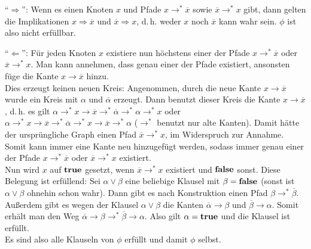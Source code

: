 \begin{Beweis}
    "`$\Rightarrow$"':
    Wenn es einen Knoten $x$ und
    Pfade $x \rightarrow^\ast \overline{x}$ sowie $\overline{x} \rightarrow^\ast x$ gibt,
    dann gelten die Implikationen $x \Rightarrow \overline{x}$ und
    $\overline{x} \Rightarrow x$, d.\,h. weder $x$ noch $\overline{x}$ kann wahr sein.
    $\phi$ ist also nicht erfüllbar.

    "`$\Leftarrow$"':
    Für jeden Knoten $x$ existiere nun höchstens einer der Pfade
    $x \rightarrow^\ast \overline{x}$ oder $\overline{x} \rightarrow^\ast x$.
    Man kann annehmen, dass genau einer der Pfade existiert,
    ansonsten füge die Kante $x \rightarrow \overline{x}$ hinzu.\\
    Dies erzeugt keinen neuen Kreis:
    Angenommen, durch die neue Kante $x \rightarrow \overline{x}$ wurde ein
    Kreis mit $\alpha$ und $\overline{\alpha}$ erzeugt.
    Dann benutzt dieser Kreis die Kante $x \rightarrow \overline{x}$, d.\,h.
    es gilt $\alpha \rightarrow^\ast x \rightarrow \overline{x} \rightarrow^\ast
    \overline{\alpha} \rightarrow^\ast \alpha \rightarrow^\ast x$
    oder $\alpha \rightarrow^\ast x \rightarrow \overline{x} \rightarrow^\ast
    \overline{\alpha} \rightarrow^\ast x \rightarrow \overline{x} \rightarrow^\ast \alpha$
    ($\rightarrow^\ast$ benutzt nur alte Kanten).
    Damit hätte der ursprüngliche Graph einen Pfad $\overline{x} \rightarrow^\ast x$,
    im Widerspruch zur Annahme.
    Somit kann immer eine Kante neu hinzugefügt werden, sodass immer
    genau einer der Pfade $x \rightarrow^\ast \overline{x}$ oder $\overline{x} \rightarrow^\ast x$
    existiert.\\
    Nun wird $x$ auf $\mathbf{true}$ gesetzt, wenn $\overline{x} \rightarrow^\ast x$ existiert
    und $\mathbf{false}$ sonst.
    Diese Belegung ist erfüllend:
    Sei $\alpha \lor \beta$ eine beliebige Klausel mit $\beta = \mathbf{false}$
    (sonst ist $\alpha \lor \beta$ ohnehin schon wahr).
    Dann gibt es nach Konstruktion einen Pfad $\beta \rightarrow^\ast \overline{\beta}$.
    Außerdem gibt es wegen der Klausel $\alpha \lor \beta$ die Kanten
    $\overline{\alpha} \rightarrow \beta$ und $\overline{\beta} \rightarrow \alpha$.
    Somit erhält man den Weg
    $\overline{\alpha} \rightarrow \beta \rightarrow^\ast \overline{\beta} \rightarrow \alpha$.
    Also gilt $\alpha = \mathbf{true}$ und die Klausel ist erfüllt.\\
    Es sind also alle Klauseln von $\phi$ erfüllt und damit $\phi$ selbst.
\end{Beweis}

\pagebreak

